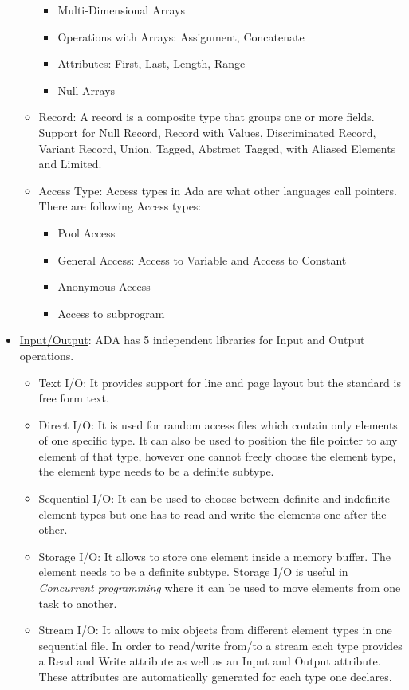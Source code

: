 \documentclass{article}
\begin{document}
\begin{itemize}
\begin{itemize}
\begin{itemize}
		\item Multi-Dimensional Arrays
		\item Operations with Arrays: Assignment, Concatenate
		\item Attributes: First, Last, Length, Range
		\item Null Arrays		
		\end{itemize}
		\item Record: A record is a composite type that groups one or more fields. \\
		Support for Null Record, Record with Values, Discriminated Record, Variant Record, Union, Tagged, Abstract Tagged, with Aliased Elements and Limited.
		\item Access Type: Access types in Ada are what other languages call pointers. There are following Access types:
			\begin{itemize}
				\item Pool Access
				\item General Access: Access to Variable and Access to Constant
				\item Anonymous Access
				\item Access to subprogram
			\end{itemize}
	\end{itemize}
	\item \uline{Input/Output}: ADA has 5 independent libraries for Input and Output operations.
	\begin{itemize}
		\item Text I/O: It provides support for line and page layout but the standard is free form text.
		\item Direct I/O: It is used for random access files which contain only elements of one specific type. It can also be used to position the file pointer to any element of that type, however one cannot freely choose the element type, the element type needs to be a definite subtype.
		\item Sequential I/O: It can be used to choose between definite and indefinite element types but one has to read and write the elements one after the other.
		\item Storage I/O: It allows to store one element inside a memory buffer. The element needs to be a
definite subtype. Storage I/O is useful in \emph{Concurrent programming} where it can be used to move elements from one task to another.
		\item Stream I/O: It allows to mix objects from different element types in one sequential file. In order to read/write from/to a stream each type provides a Read and Write attribute as well as an Input and Output attribute. These attributes are automatically generated for each type one declares.


\end{itemize}
\end{itemize}
\end{document}
